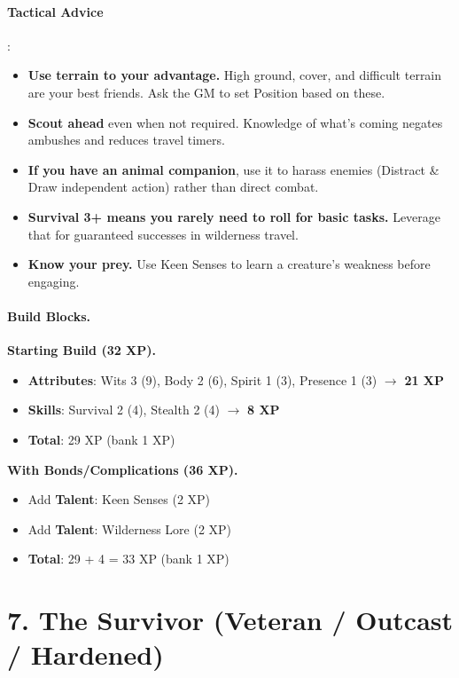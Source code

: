 \paragraph{Tactical Advice}:
\begin{itemize}
\item \textbf{Use terrain to your advantage.} High ground, cover, and difficult terrain are your best friends. Ask the GM to set Position based on these.
\item \textbf{Scout ahead} even when not required. Knowledge of what's coming negates ambushes and reduces travel timers.
\item \textbf{If you have an animal companion}, use it to harass enemies (Distract \& Draw independent action) rather than direct combat.
\item \textbf{Survival 3+ means you rarely need to roll for basic tasks.} Leverage that for guaranteed successes in wilderness travel.
\item \textbf{Know your prey.} Use Keen Senses to learn a creature's weakness before engaging.
\end{itemize}

\paragraph{Build Blocks.}
\textbf{Starting Build (32 XP).}
\begin{itemize}
\item \textbf{Attributes}: Wits 3 (9), Body 2 (6), Spirit 1 (3), Presence 1 (3) \(\rightarrow\) \textbf{21 XP}
\item \textbf{Skills}: Survival 2 (4), Stealth 2 (4) \(\rightarrow\) \textbf{8 XP}
\item \textbf{Total}: 29 XP (bank 1 XP)
\end{itemize}
\textbf{With Bonds/Complications (36 XP).}
\begin{itemize}
\item Add \textbf{Talent}: Keen Senses (2 XP)
\item Add \textbf{Talent}: Wilderness Lore (2 XP)
\item \textbf{Total}: 29 + 4 = 33 XP (bank 1 XP)
\end{itemize}

\section{7. The Survivor (Veteran / Outcast / Hardened)}
\label{sec:concept-survivor}

